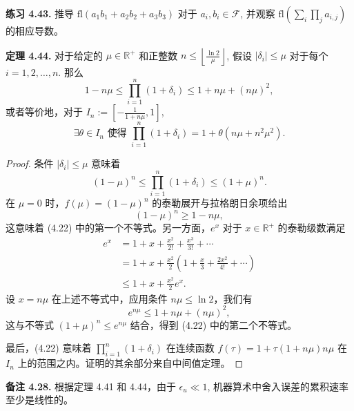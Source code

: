 \documentclass[a4paper]{ctexart}
\begin{document}
{%

\noindent \textbf{练习 4.43.} 推导 $\text{fl}(a_1b_1 + a_2b_2 + a_3b_3)$ 对于 $a_i, b_i \in \mathcal{F}$, 
并观察 $\text{fl}(\sum_i \prod_j a_{i,j})$ 的相应导数。

\noindent \textbf{定理 4.44.} 对于给定的 $\mu \in \mathbb{R}^+$ 和正整数 $n \leq \left\lfloor \frac{\ln 2}{\mu} \right\rfloor$, 
假设 $|\delta_i| \leq \mu$ 对于每个 $i = 1, 2, \ldots, n$. 那么
\[
  1 - n\mu \leq \prod_{i=1}^{n} (1 + \delta_i) \leq 1 + n\mu + (n\mu)^2, \tag{4.22}
\]
或者等价地，对于 $I_n := \left[-\frac{1}{1+n\mu}, 1\right]$,
\[
  \exists \theta \in I_n \text{ 使得 } \prod_{i=1}^{n} (1 + \delta_i) = 1 + \theta(n\mu + n^2\mu^2). \tag{4.23}
\]

\begin{proof}
条件 $|\delta_i| \leq \mu$ 意味着
\[
  (1 - \mu)^n \leq \prod_{i=1}^{n} (1 + \delta_i) \leq (1 + \mu)^n.
\]
在 $\mu = 0$ 时，$f(\mu) = (1 - \mu)^n$ 的泰勒展开与拉格朗日余项给出
\[
  (1 - \mu)^n \geq 1 - n\mu,
\]
这意味着 (4.22) 中的第一个不等式。另一方面，$e^x$ 对于 $x \in \mathbb{R}^+$ 的泰勒级数满足
\begin{align*}
e^x &= 1 + x + \frac{x^2}{2!} + \frac{x^3}{3!} + \cdots \\
&= 1 + x + \frac{x^2}{2}\left(1 + \frac{x}{3} + \frac{2x^2}{4!} + \cdots\right) \\
&\leq 1 + x + \frac{x^2}{2}e^x.
\end{align*}
设 $x = n\mu$ 在上述不等式中，应用条件 $n\mu \leq \ln 2$，我们有
\[
e^{n\mu} \leq 1 + n\mu + (n\mu)^2,
\]
这与不等式 $(1 + \mu)^n \leq e^{n\mu}$ 结合，得到 (4.22) 中的第二个不等式。

最后，(4.22) 意味着 $\prod_{i=1}^{n} (1 + \delta_i)$ 在连续函数 $f(\tau) = 1 + \tau(1 + n\mu)n\mu$ 在 $I_n$ 上的范围之内。证明的其余部分来自中间值定理。
\end{proof}

\noindent \textbf{备注 4.28.} 根据定理 4.41 和 4.44，由于 $\epsilon_u \ll 1$, 机器算术中舍入误差的累积速率至少是线性的。

}
\end{document}
